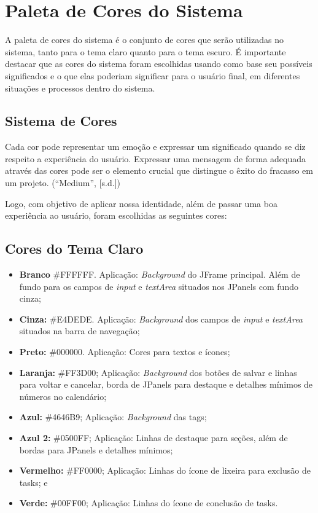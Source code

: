\documentclass[a4paper,12pt]{article}
\begin{document}
\pagebreak
\section{Paleta de Cores do Sistema}
A paleta de cores do sistema é o conjunto de cores que serão utilizadas no sistema, tanto para o tema claro quanto 
para o tema escuro. É importante destacar que as cores do sistema foram escolhidas usando como base seu possíveis 
significados e o que elas poderiam significar para o usuário final, em diferentes situações e processos dentro do sistema. 

\subsection{Sistema de Cores}
Cada cor pode representar um emoção e expressar um significado quando se diz respeito a experiência do usuário. Expressar uma 
mensagem de forma adequada através das cores pode ser o elemento crucial que distingue o êxito do fracasso em um projeto. (“Medium”, [s.d.])

Logo, com objetivo de aplicar nossa identidade, além de passar uma boa experiência ao usuário, foram escolhidas as seguintes cores:

\subsection{Cores do Tema Claro}
\begin{itemize}
	\item \textbf{Branco} \#FFFFFF. Aplicação: \textit{Background} do JFrame principal. Além de fundo para os campos de \textit{input} e \textit{textArea} 
	situados nos JPanels com fundo cinza;
	\item \textbf{Cinza:} \#E4DEDE. Aplicação: \textit{Background} dos campos de \textit{input} e \textit{textArea} situados na barra de navegação;
	\item \textbf{Preto:} \#000000. Aplicação: Cores para textos e ícones;
	\item \textbf{Laranja:} \#FF3D00; Aplicação: \textit{Background} dos botões de salvar e linhas para voltar e cancelar, borda de JPanels 
	para destaque e detalhes mínimos de números no calendário;
	\item \textbf{Azul:} \#4646B9; Aplicação: \textit{Background} das tags;
	\item \textbf{Azul 2:} \#0500FF; Aplicação: Linhas de destaque para seções, além de bordas para JPanels e detalhes mínimos;
	\item \textbf{Vermelho:} \#FF0000; Aplicação: Linhas do ícone de lixeira para exclusão de tasks; e
	\item \textbf{Verde:} \#00FF00; Aplicação: Linhas do ícone de conclusão de tasks.
\end{itemize}
\end{document}
